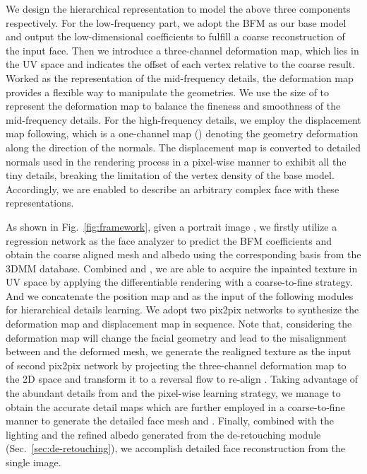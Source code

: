 \documentclass[10pt,twocolumn,letterpaper]{article}
\begin{document}
We design the hierarchical representation to model the above three components respectively. For the low-frequency part, we adopt the BFM as our base model and output the low-dimensional coefficients to fulfill a coarse reconstruction of the input face. Then we introduce a three-channel deformation map, which lies in the UV space and indicates the offset of each vertex relative to the coarse result. Worked as the representation of the mid-frequency details, the deformation map provides a flexible way to manipulate the geometries. We use the size of  to represent the deformation map to balance the fineness and smoothness of the mid-frequency details. For the high-frequency details, we employ the displacement map following\cite{feng2021learning}, which is a one-channel map () denoting the geometry deformation along the direction of the normals. The displacement map is converted to detailed normals used in the rendering process in a pixel-wise manner to exhibit all the tiny details, breaking the limitation of the vertex density of the base model. Accordingly, we are enabled to describe an arbitrary complex face with these representations. 

As shown in Fig.~\ref{fig:framework}, given a portrait image , we firstly utilize a regression network as the face analyzer to predict the BFM coefficients and obtain the coarse aligned mesh  and albedo  using the corresponding basis from the 3DMM database. Combined  and , we are able to acquire the inpainted texture  in UV space by applying the differentiable rendering with a coarse-to-fine strategy. And we concatenate the position map  and  as the input of the following modules for hierarchical details learning. We adopt two pix2pix\cite{2016Image} networks to synthesize the deformation map and displacement map in sequence.
Note that, considering the deformation map will change the facial geometry and lead to the misalignment between  and the deformed mesh, we generate the realigned texture  as the input of second pix2pix network by projecting the three-channel deformation map to the 2D space and transform it to a reversal flow  to re-align . Taking advantage of the abundant details from  and the pixel-wise learning strategy, we manage to obtain the accurate detail maps which are further employed in a coarse-to-fine manner to generate the detailed face mesh  and . Finally, combined with the lighting  and the refined albedo generated from the de-retouching module (Sec.~\ref{sec:de-retouching}), we accomplish detailed face reconstruction from the single image. 
\end{document}
